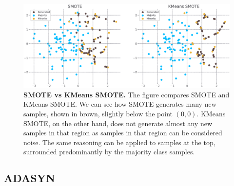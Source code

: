 \begin{figure}
    \centering
    \includegraphics[width=\linewidth]{figures/smote_vs_kmeanssmote.eps}
    \caption{
        \textbf{SMOTE vs KMeans SMOTE.} The figure compares SMOTE and KMeans SMOTE. We can see how
        SMOTE generates many new samples, shown in brown, slightly below the point $(0, 0)$. KMeans
        SMOTE, on the other hand, does not generate almost any new samples in that region as
        samples in that region can be considered noise. The same reasoning can be applied to
        samples at the top, surrounded predominantly by the majority class samples.
    }
    \label{figure:smote-vs-kmeanssmote}
\end{figure}


\subsection{ADASYN}
\label{subsection:adasyn}

